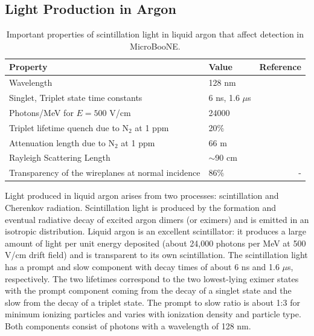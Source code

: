 \subsection{Light Production in Argon \label{sint}}




\begin{table}[t]
   \centering
    \caption{Important properties of scintillation light in liquid argon that affect detection in MicroBooNE.} 
    \begin{tabular}{llr} %
    \hline
    Property & Value & Reference\\
    \hline
    Wavelength & 128 nm & \cite{SUZUKI1979197}\\
    Singlet, Triplet state time constants & 6 ns, 1.6 $\mu$s &\cite{PhysRevB.27.5279} \\
    Photons/MeV for $E=500$ V/cm & 24000 & \cite{Amerio:2004-T600}\\
     Triplet lifetime quench due to N$_2$ at 1 ppm  & 20$\%$ & \cite{Acciarri:2008kv} \\
     Attenuation length due to N$_2$ at 1 ppm & 66 m &\cite{Jones:2013bca} \\
     Rayleigh Scattering Length & $\sim$90 cm &\cite{1997NIMPA.384..380I} \\
     Transparency of the wireplanes at normal incidence & 86$\%$ & -\\
    \hline
   \end{tabular}
   \label{tab:lightparam}
\end{table} 

Light produced in liquid argon arises from two processes: scintillation and Cherenkov radiation.  
Scintillation light is produced by the formation and eventual radiative decay of excited argon dimers (or eximers) and is emitted in an isotropic distribution.  Liquid argon is an excellent scintillator: it produces a large amount of light per unit energy deposited (about 24,000 photons per MeV at 500 V/cm drift field) and is transparent to its own scintillation. %
The scintillation light has a prompt and slow component with decay times of about 6 ns and 1.6 $\mu$s, respectively. The two lifetimes correspond to the two lowest-lying eximer states with the prompt component coming from the decay of a singlet state and the slow from the decay of a triplet state.  The prompt to slow ratio is about 1:3 for minimum ionizing particles and varies with ionization density and particle type. Both components consist of photons with a wavelength of 128 nm.


